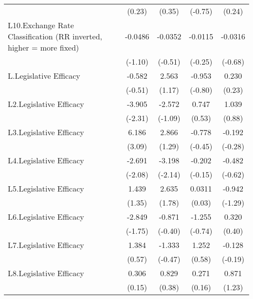 {\begin{longtable}{l*{4}{c}}
                &   (0.23)         &   (0.35)         &  (-0.75)         &   (0.24)         \\
[1em]
L10.Exchange Rate Classification (RR inverted, higher = more fixed)&  -0.0486         &  -0.0352         &  -0.0115         &  -0.0316         \\
                &  (-1.10)         &  (-0.51)         &  (-0.25)         &  (-0.68)         \\
[1em]
L.Legislative Efficacy&   -0.582         &    2.563         &   -0.953         &    0.230         \\
                &  (-0.51)         &   (1.17)         &  (-0.80)         &   (0.23)         \\
[1em]
L2.Legislative Efficacy&   -3.905\sym{*}  &   -2.572         &    0.747         &    1.039         \\
                &  (-2.31)         &  (-1.09)         &   (0.53)         &   (0.88)         \\
[1em]
L3.Legislative Efficacy&    6.186\sym{**} &    2.866         &   -0.778         &   -0.192         \\
                &   (3.09)         &   (1.29)         &  (-0.45)         &  (-0.28)         \\
[1em]
L4.Legislative Efficacy&   -2.691\sym{*}  &   -3.198\sym{*}  &   -0.202         &   -0.482         \\
                &  (-2.08)         &  (-2.14)         &  (-0.15)         &  (-0.62)         \\
[1em]
L5.Legislative Efficacy&    1.439         &    2.635         &   0.0311         &   -0.942         \\
                &   (1.35)         &   (1.78)         &   (0.03)         &  (-1.29)         \\
[1em]
L6.Legislative Efficacy&   -2.849         &   -0.871         &   -1.255         &    0.320         \\
                &  (-1.75)         &  (-0.40)         &  (-0.74)         &   (0.40)         \\
[1em]
L7.Legislative Efficacy&    1.384         &   -1.333         &    1.252         &   -0.128         \\
                &   (0.57)         &  (-0.47)         &   (0.58)         &  (-0.19)         \\
[1em]
L8.Legislative Efficacy&    0.306         &    0.829         &    0.271         &    0.871         \\
                &   (0.15)         &   (0.38)         &   (0.16)         &   (1.23)         \\

\end{longtable}}
